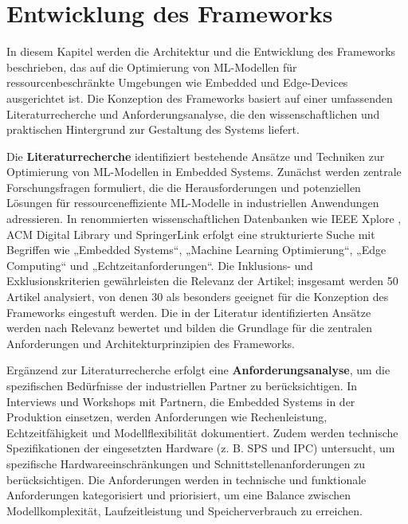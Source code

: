 \chapter{Entwicklung des Frameworks}
\label{chap:entwicklung_framework}
In diesem Kapitel werden die Architektur und die Entwicklung des Frameworks beschrieben, das auf die Optimierung von ML-Modellen für ressourcenbeschränkte Umgebungen 
wie Embedded und Edge-Devices ausgerichtet ist. Die Konzeption des Frameworks basiert auf einer umfassenden Literaturrecherche und Anforderungsanalyse, die den wissenschaftlichen 
und praktischen Hintergrund zur Gestaltung des Systems liefert.

Die \textbf{Literaturrecherche} identifiziert bestehende Ansätze und Techniken zur Optimierung von ML-Modellen in Embedded Systems. Zunächst werden zentrale Forschungsfragen 
formuliert, die die Herausforderungen und potenziellen Lösungen für ressourceneffiziente ML-Modelle in industriellen Anwendungen adressieren. In renommierten wissenschaftlichen 
Datenbanken wie IEEE Xplore \cite{IEEE_Xplore}, ACM Digital Library \cite{10.1145/3674912.3674918} und SpringerLink \cite{farbiz2023knowledge} erfolgt eine strukturierte Suche mit 
Begriffen wie „Embedded Systems“, „Machine Learning Optimierung“, „Edge Computing“ und „Echtzeitanforderungen“. Die Inklusions- und Exklusionskriterien gewährleisten die Relevanz 
der Artikel; insgesamt werden 50 Artikel analysiert, von denen 30 als besonders geeignet für die Konzeption des Frameworks eingestuft werden. Die in der Literatur identifizierten 
Ansätze werden nach Relevanz bewertet und bilden die Grundlage für die zentralen Anforderungen und Architekturprinzipien des Frameworks.

Ergänzend zur Literaturrecherche erfolgt eine \textbf{Anforderungsanalyse}, um die spezifischen Bedürfnisse der industriellen Partner zu berücksichtigen. In Interviews und Workshops 
mit Partnern, die Embedded Systems in der Produktion einsetzen, werden Anforderungen wie Rechenleistung, Echtzeitfähigkeit und Modellflexibilität dokumentiert. Zudem werden 
technische Spezifikationen der eingesetzten Hardware (z. B. SPS und IPC) untersucht, um spezifische Hardwareeinschränkungen und Schnittstellenanforderungen zu berücksichtigen. 
Die Anforderungen werden in technische und funktionale Anforderungen kategorisiert und priorisiert, um eine Balance zwischen Modellkomplexität, Laufzeitleistung und Speicherverbrauch 
zu erreichen.

